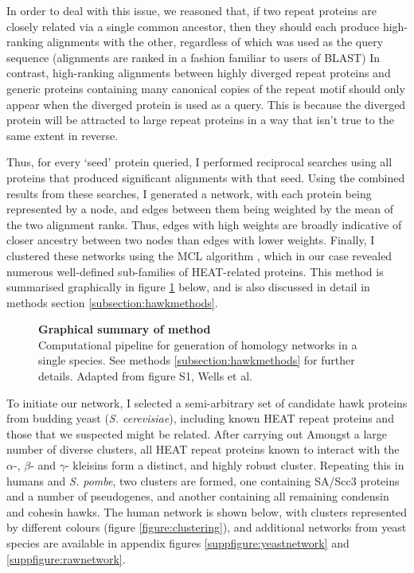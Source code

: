 \documentclass[a4paper,11pt,twoside,openright]{scrbook}
\begin{document}
In order to deal with this issue, we reasoned that, if two repeat proteins are closely related via a single common ancestor, then they should each produce high-ranking alignments with the other, regardless of which was used as the query sequence (alignments are ranked in a fashion familiar to users of BLAST) In contrast, high-ranking alignments between highly diverged repeat proteins and generic proteins containing many canonical copies of the repeat motif should only appear when the diverged protein is used as a query. This is because the diverged protein will be attracted to large repeat proteins in a way that isn't true to the same extent in reverse.

Thus, for every `seed' protein queried, I performed reciprocal searches using all proteins that produced significant alignments with that seed. Using the combined results from these searches, I generated a network, with each protein being represented by a node, and edges between them being weighted by the mean of the two alignment ranks. Thus, edges with high weights are broadly indicative of closer ancestry between two nodes than edges with lower weights. Finally, I clustered these networks using the MCL algorithm \cite{VanDongen2000}, which in our case revealed numerous well-defined sub-families of HEAT-related proteins. This method is summarised graphically in figure \ref{figure:hawkmethod} below, and is also discussed in detail in methods section \ref{subsection:hawkmethods}.

\begin{figure}[h]
    \caption[Graphical summary of method]{\sffamily \textbf{Graphical summary of method} \\ \small Computational pipeline for generation of homology networks in a single species. See methods \ref{subsection:hawkmethods} for further details. Adapted from figure S1, Wells et al. \cite{Wells2017}}
    \label{figure:hawkmethod}
\end{figure}

To initiate our network, I selected a semi-arbitrary set of candidate hawk proteins from budding yeast (\textit{S. cerevisiae}), including known HEAT repeat proteins and those that we suspected might be related. After carrying out Amongst a large number of diverse clusters, all HEAT repeat proteins known to interact with the $\alpha$-, $\beta$- and $\gamma$- kleisins \cite{Nasmyth2009, Hirano2016} form a distinct, and highly robust cluster. Repeating this in humans and \textit{S. pombe}, two clusters are formed, one containing SA/Scc3 proteins and a number of pseudogenes, and another containing all remaining condensin and cohesin hawks. The human network is shown below, with clusters represented by different colours (figure \ref{figure:clustering}), and additional networks from yeast species are available in appendix figures \ref{suppfigure:yeastnetwork} and \ref{suppfigure:rawnetwork}.
\end{document}
